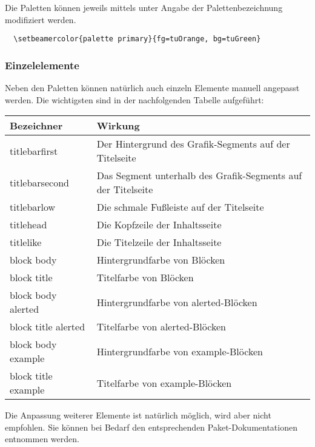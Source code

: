 Die Paletten können jeweils mittels 
unter Angabe der Palettenbezeichnung modifiziert werden.

\begin{example}
\begin{lstlisting}
  \setbeamercolor{palette primary}{fg=tuOrange, bg=tuGreen}
\end{lstlisting}
\end{example}

\subsubsection{Einzelelemente}

Neben den Paletten können natürlich auch einzeln Elemente manuell angepasst
werden. Die wichtigsten sind in der nachfolgenden Tabelle aufgeführt:

\begin{tabularx}{\textwidth}{lX}
  Bezeichner & Wirkung\\
  \midrule
  \ttfamily titlebarfirst &
    Der Hintergrund des Grafik-Segments auf der Titelseite\\
  \ttfamily titlebarsecond &
    Das Segment unterhalb des Grafik-Segments auf der Titelseite\\
  \ttfamily titlebarlow &
    Die schmale Fußleiste auf der Titelseite\\
  \ttfamily titlehead &
    Die Kopfzeile der Inhaltsseite\\
  \ttfamily titlelike &
    Die Titelzeile der Inhaltsseite\\
  \ttfamily block body &
    Hintergrundfarbe von Blöcken\\
  \ttfamily block title &
    Titelfarbe von Blöcken\\
  \ttfamily block body alerted &
    Hintergrundfarbe von alerted-Blöcken\\
  \ttfamily block title alerted &
    Titelfarbe von alerted-Blöcken\\
  \ttfamily block body example &
    Hintergrundfarbe von example-Blöcken\\
  \ttfamily block title example &
    Titelfarbe von example-Blöcken\
\end{tabularx}

Die Anpassung weiterer Elemente ist natürlich möglich,
wird aber nicht empfohlen.
Sie können bei Bedarf den entsprechenden Paket-Dokumentationen entnommen werden.


% 
% 


